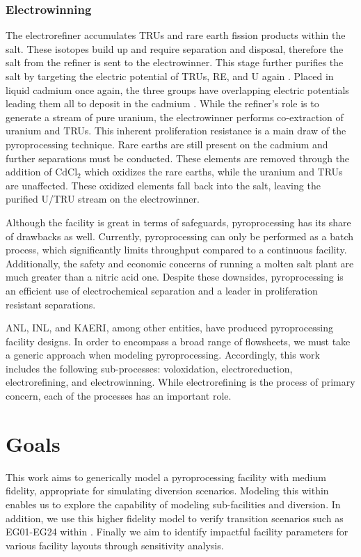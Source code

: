\subsubsection{Electrowinning}
The electrorefiner accumulates TRUs and rare earth fission products within the salt.
These isotopes build up and require separation and disposal, therefore the salt from the refiner is sent to the electrowinner.
This stage further purifies the salt by targeting the electric potential of TRUs, RE, and U again \cite{lee_korean_2011,organisation}.
Placed in liquid cadmium once again, the three groups have overlapping electric potentials leading them all to deposit in the cadmium \cite{lee_korean_2011}. 
While the refiner's role is to generate a stream of pure uranium, the electrowinner performs co-extraction of uranium and TRUs.
This inherent proliferation resistance is a main draw of the pyroprocessing technique.
Rare earths are still present on the cadmium and further separations must be conducted.
These elements are removed through the addition of CdCl$_2$ which oxidizes the rare earths, while the uranium and TRUs are unaffected.
These oxidized elements fall back into the salt, leaving the purified U/TRU stream on the electrowinner.


Although the facility is great in terms of safeguards, pyroprocessing has its share of drawbacks as well.
Currently, pyroprocessing can only be performed as a batch process, which significantly limits throughput compared to a continuous facility. 
Additionally, the safety and economic concerns of running a molten salt plant are much greater than a nitric acid one.
Despite these downsides, pyroprocessing is an efficient use of electrochemical separation and a leader in proliferation resistant separations.

ANL, INL, and KAERI, among other entities, have produced pyroprocessing facility designs.
In order to encompass a broad range of flowsheets, we must take a generic approach when modeling pyroprocessing. Accordingly, this work includes the following sub-processes: voloxidation, electroreduction, electrorefining, and electrowinning. 
While electrorefining is the process of primary concern, each of the processes has an important role. 

\section{Goals}

This work aims to generically model a pyroprocessing facility with medium fidelity, appropriate for simulating diversion scenarios. Modeling
this within \Cyclus enables us to explore the capability of modeling sub-facilities and diversion. In addition, we use this higher fidelity model to verify transition
scenarios such as EG01-EG24 within \Cyclus \cite{wigeland_nuclear_2014}. Finally we aim to identify impactful facility parameters for
various facility layouts through sensitivity analysis. 
